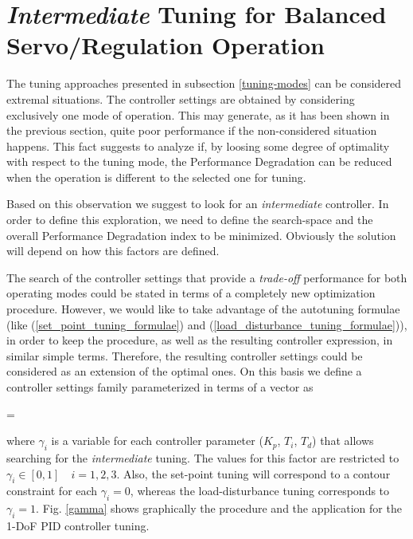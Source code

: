 %
\section{\emph{Intermediate} Tuning for Balanced Servo/Regulation Operation}
\label{methodology}
%

The tuning approaches presented in subsection \ref{tuning-modes}
can be considered extremal situations. The controller settings are
obtained by considering exclusively one mode of operation. This
may generate, as it has been shown in the previous section, quite
poor performance if the non-considered situation happens. This
fact suggests to analyze if, by loosing some degree of optimality
with respect to the tuning mode, the Performance Degradation can
be reduced when the operation is different to the selected one for
tuning.

Based on this observation we suggest to look for an
\emph{intermediate} controller. In order to define this
exploration, we need to define the search-space and the overall
Performance Degradation index to be minimized. Obviously the
solution will depend on how this factors are defined.

The search of the controller settings that provide a
\emph{trade-off} performance for both operating modes could be
stated in terms of a completely new optimization procedure.
However, we would like to take advantage of the autotuning
formulae (like (\ref{set_point_tuning_formulae}) and
(\ref{load_disturbance_tuning_formulae})), in order to keep the
procedure, as well as the resulting controller expression, in
similar simple terms. Therefore, the resulting controller settings
could be considered as an extension of the optimal ones. On this
basis we define a controller settings family parameterized in
terms of a vector as

\be \overline{\gamma} =  \ee

\noindent where $\gamma_i$ is a variable for each controller
parameter ($K_p$, $T_i$, $T_d$) that allows searching for the
\emph{intermediate} tuning. The values for this factor are
restricted to $\gamma_i \in [0,1]\quad i=1,2,3$. Also, the
set-point tuning will correspond to a contour constraint for each
$\gamma_i=0$, whereas the load-disturbance tuning corresponds to
$\gamma_i=1$. Fig. \ref{gamma} shows graphically the procedure and
the application for the 1-DoF PID controller tuning.

